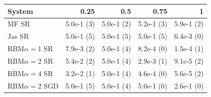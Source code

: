 \begin{tabular}{lrrrr}\toprule
System & 0.25 & 0.5 & 0.75 & 1 \\\midrule
MF SR & 5.0e-1 (3) & 5.0e-1 (2) & 5.2e-1 (3) & 5.9e-1 (2) \\
Jas SR & 5.0e-1 (5) & 5.0e-1 (5) & 5.0e-1 (5) & 6.4e-3 (0) \\
RBM$\alpha{=}$1 SR & 7.9e-3 (2) & 5.0e-1 (4) & 8.2e-4 (0) & 1.5e-4 (1) \\
RBM$\alpha{=}$2 SR & 5.4e-2 (2) & 5.0e-1 (4) & 2.9e-3 (1) & 9.1e-5 (2) \\
RBM$\alpha{=}$4 SR & 3.2e-2 (1) & 5.0e-1 (4) & 4.6e-4 (0) & 5.6e-5 (2) \\
RBM$\alpha{=}$2 SGD & 5.0e-1 (5) & 5.0e-1 (4) & 5.0e-1 (0) & 2.6e-1 (0) \\
\bottomrule\end{tabular}
